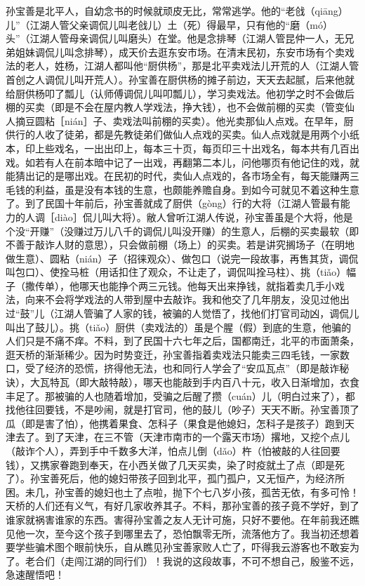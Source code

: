 \documentclass[12pt,UTF8]{ctexbook}
\begin{document}
孙宝善是北平人，自幼念书的时候就顽皮无比，常常逃学。他的“老戗（qiāng）儿”（江湖人管父亲调侃儿叫老戗儿）土（死）得最早，只有他的“磨（mó）头”（江湖人管母亲调侃儿叫磨头）在堂。他是念排琴（江湖人管昆仲一人，无兄弟姐妹调侃儿叫念排琴），成天价去逛东安市场。在清末民初，东安市场有个卖戏法的老人，姓杨，江湖人都叫他“厨供杨”，那是北平卖戏法儿开荒的人（江湖人管首创之人调侃儿叫开荒人）。孙宝善在厨供杨的摊子前边，天天去起腻，后来他就给厨供杨叩了瓢儿（认师傅调侃儿叫叩瓢儿），学习卖戏法。他初学之时不会做后棚的买卖（即是不会在屋内教人学戏法，挣大钱），也不会做前棚的买卖（管变仙人摘豆圆粘［nián］子、卖戏法叫前棚的买卖）。他光卖那仙人点戏。在早年，厨供行的人收了徒弟，都是先教徒弟们做仙人点戏的买卖。仙人点戏就是用两个小纸本，印上些戏名，一出出印上，每本三十页，每页印三十出戏名，每本共有几百出戏。如若有人在前本暗中记了一出戏，再翻第二本儿，问他哪页有他记住的戏，就能猜出记的是哪出戏。在民初的时代，卖仙人点戏的，各市场全有，每天能赚两三毛钱的利益，虽是没有本钱的生意，也颇能养赡自身。到如今可就见不着这种生意了。到了民国十年前后，孙宝善就成了厨供（gòng）行的大将（江湖人管最有能力的人调［diào］侃儿叫大将）。敝人曾听江湖人传说，孙宝善虽是个大将，他是个没“开赚”（没赚过万儿八千的调侃儿叫没开赚）的生意人，后棚的买卖最软（即不善于敲诈人财的意思），只会做前棚（场上）的买卖。若是讲究搁场子（在明地做生意）、圆粘（nián）子（招徕观众）、做包口（说完一段故事，再售其货，调侃叫包口）、使拴马桩（用话扣住了观众，不让走了，调侃叫拴马柱）、挑（tiǎo）幅子（撒传单），他哪天也能挣个两三元钱。他每天出来挣钱，就指着卖几手小戏法，向来不会将学戏法的人带到屋中去敲诈。我和他交了几年朋友，没见过他出过“鼓”儿（江湖人管骗了人家的钱，被骗的人觉悟了，找他们打官司动凶，调侃儿叫出了鼓儿）。挑（tiǎo）厨供（卖戏法的）虽是个腥（假）到底的生意，他骗的人们只是不痛不痒。不料，到了民国十六七年之后，国都南迁，北平的市面萧条，逛天桥的渐渐稀少。因为时势变迁，孙宝善指着卖戏法只能卖三四毛钱，一家数口，受了经济的恐慌，挤得他无法，也和同行人学会了“安瓜瓦点”（即是敲诈秘诀），大瓦特瓦（即大敲特敲），哪天也能敲到手内百八十元，收入日渐增加，衣食丰足了。那被骗的人也随着增加，受骗之后醒了攒（cuán）儿（明白过来了），都找他往回要钱，不是吵闹，就是打官司，他的鼓儿（吵子）天天不断。孙宝善顶了瓜（即是害了怕），他携着果食、怎科子（果食是他媳妇，怎科子是孩子）跑到天津去了。到了天津，在三不管（天津市南市的一个露天市场）撂地，又挖个点儿（敲诈个人），弄到手中千数多大洋，怕点儿倒（dǎo）杵（怕被敲的人往回要钱），又携家眷跑到奉天，在小西关做了几天买卖，染了时疫就土了点（即是死了）。孙宝善死后，他的媳妇带孩子回到北平，孤门孤户，又无恒产，为经济所困。未几，孙宝善的媳妇也土了点啦，抛下个七八岁小孩，孤苦无依，有多可怜！天桥的人们还有义气，有好几家收养其子。不料，那孙宝善的孩子竟不学好，到了谁家就祸害谁家的东西。害得孙宝善之友人无计可施，只好不要他。在年前我还瞧见他一次，至今这个孩子到哪里去了，恐怕飘零无所，流落他方了。我当初还想着要学些骗术图个眼前快乐，自从瞧见孙宝善家败人亡了，吓得我云游客也不敢妄为了。老合们（走闯江湖的同行们）！我说的这段故事，不可不想自己，殷鉴不远，急速醒悟吧！
\end{document}
